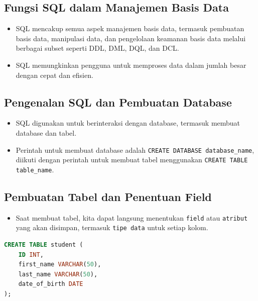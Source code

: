 \documentclass{article}
\begin{document}
\subsection{Fungsi SQL dalam Manajemen Basis Data}
\begin{itemize}
    \item SQL mencakup semua aspek manajemen basis data, termasuk pembuatan basis data, manipulasi data, dan pengelolaan keamanan basis data melalui berbagai subset seperti DDL, DML, DQL, dan DCL.\@
    \item SQL memungkinkan pengguna untuk memproses data dalam jumlah besar dengan cepat dan efisien.
\end{itemize}

\subsection{Pengenalan SQL dan Pembuatan Database}
\begin{itemize}
    \item SQL digunakan untuk berinteraksi dengan database, termasuk membuat database dan tabel.
    \item Perintah untuk membuat database adalah \texttt{CREATE DATABASE database\_name}, diikuti dengan perintah untuk membuat tabel menggunakan \texttt{CREATE TABLE table\_name}.
\end{itemize}

\subsection{Pembuatan Tabel dan Penentuan Field}
\begin{itemize}
    \item Saat membuat tabel, kita dapat langsung menentukan \texttt{field} atau \texttt{atribut} yang akan disimpan, termasuk \texttt{tipe data} untuk setiap kolom.
\end{itemize}
\begin{lstlisting}[language=SQL, caption={SQL: Membuat Entitas dengan Atributnya}, captionpos=b]
CREATE TABLE student (  
	ID INT,  
	first_name VARCHAR(50),  
	last_name VARCHAR(50),  
	date_of_birth DATE  
);
\end{lstlisting}
\end{document}

